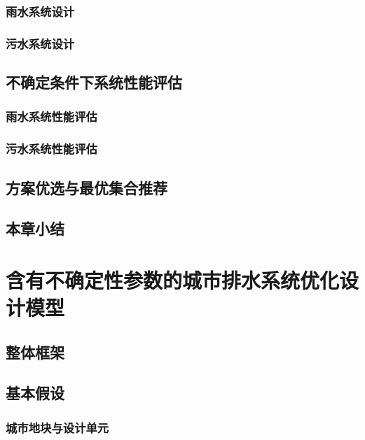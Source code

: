 \documentclass[degree=doctor]{thuthesis}
\begin{document}
\subsection{雨水系统设计}

\clearpage
\setcounter{page}{57}
\subsection{污水系统设计}

\clearpage
\setcounter{page}{59}
\section{不确定条件下系统性能评估}

\clearpage
\setcounter{page}{60}
\subsection{雨水系统性能评估}

\clearpage
\setcounter{page}{61}
\subsection{污水系统性能评估}

\clearpage
\setcounter{page}{62}
\section{方案优选与最优集合推荐}

\clearpage
\setcounter{page}{63}
\section{本章小结}


\clearpage
\setcounter{page}{64}
\chapter{含有不确定性参数的城市排水系统优化设计模型}
\section{整体框架}

\clearpage
\setcounter{page}{65}
\section{基本假设}
\subsection{城市地块与设计单元}
\end{document}
